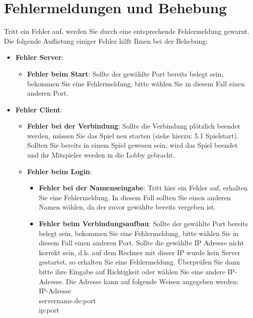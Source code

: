 \documentclass[titlepage,10pt,a4paper]{article}
\begin{document}
\section{Fehlermeldungen und Behebung}
Tritt ein Fehler auf, werden Sie durch eine entsprechende Fehlermeldung gewarnt.
Die folgende Auflistung einiger Fehler hilft Ihnen bei der Behebung:
\begin{itemize}
\item \textbf{Fehler Server}:
	\begin{itemize}
	\item \textbf{Fehler beim Start}:
		Sollte der gewählte Port bereits belegt sein, bekommen Sie eine Fehlermeldung, bitte wählen Sie in diesem Fall einen anderen Port.
	\end{itemize}
\item \textbf{Fehler Client}:
	\begin{itemize}
	\item \textbf{Fehler bei der Verbindung}:
		Sollte die Verbindung plötzlich beendet werden, müssen Sie das Spiel neu starten (siehe hierzu: 5.1 Spielstart). Sollten Sie bereits in einem Spiel gewesen sein, wird das Spiel beendet und ihr Mitspieler werden in die Lobby gebracht.
	\item \textbf{Fehler beim Login}:
		\begin{itemize}
		\item \textbf{Fehler bei der Namenseingabe}:
			Tritt hier ein Fehler auf, erhalten Sie eine Fehlermeldung. In diesem Fall sollten Sie einen anderen Namen wählen, da der zuvor gewählte bereits vergeben ist.
		\item \textbf{Fehler beim Verbindungsaufbau}:
			Sollte der gewählte Port bereits belegt sein, bekommen Sie eine Fehlermeldung, bitte wählen Sie in diesem Fall einen anderen Port.
Sollte die gewählte IP Adresse nicht korrekt sein, d.h. auf dem Rechner mit dieser IP wurde kein Server gestartet, so erhalten Sie eine Fehlermeldung. Überprüfen Sie dann bitte ihre Eingabe auf Richtigkeit oder wählen Sie eine andere IP-Adresse.
Die Adresse kann auf folgende Weisen angegeben werden: \\
IP-Adresse\\
servername.de:port\\
ip:port\\
		\end{itemize}
	\end{itemize}
\end{itemize}
\end{document}
